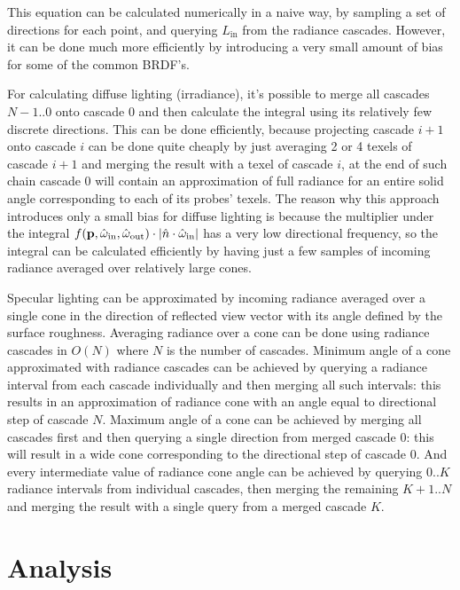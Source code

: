 \documentclass{jcgt}
\begin{document}
This equation can be calculated numerically in a naive way, by sampling a set of directions for each point, and querying $L_{\mathrm{in}}$ from the radiance cascades. However, it can be done much more efficiently by introducing a very small amount of bias for some of the common BRDF's.

For calculating diffuse lighting (irradiance), it's possible to merge all cascades $N-1..0$ onto cascade 0 and then calculate the integral using its relatively few discrete directions. This can be done efficiently, because projecting cascade $i+1$ onto cascade $i$ can be done quite cheaply by just averaging 2 or 4 texels of cascade $i+1$ and merging the result with a texel of cascade $i$, at the end of such chain cascade 0 will contain an approximation of full radiance for an entire solid angle corresponding to each of its probes' texels. The reason why this approach introduces only a small bias for diffuse lighting is because the multiplier under the integral $ f(\textbf p, \hat \omega_\mathrm{in}, \hat{\omega}_\mathrm{out}) \cdot |\hat{n} \cdot \hat{\omega}_\mathrm{in} |$ has a very low directional frequency, so the integral can be calculated efficiently by having just a few samples of incoming radiance averaged over relatively large cones.

Specular lighting can be approximated by incoming radiance averaged over a single cone in the direction of reflected view vector with its angle defined by the surface roughness. Averaging radiance over a cone can be done using radiance cascades in $O(N)$ where $N$ is the number of cascades. Minimum angle of a cone approximated with radiance cascades can be achieved by querying a radiance interval from each cascade individually and then merging all such intervals: this results in an approximation of radiance cone with an angle equal to directional step of cascade $N$.  Maximum angle of a cone can be achieved by merging all cascades first and then querying a single direction from merged cascade 0: this will result in a wide cone corresponding to the directional step of cascade 0. And every intermediate value of radiance cone angle can be achieved by querying $0..K$ radiance intervals from individual cascades, then merging the remaining $K+1..N$ and merging the result with a single query from a merged cascade $K$.

\section{Analysis}
\end{document}
